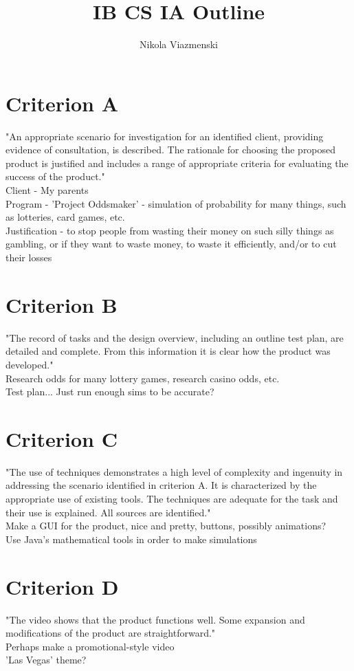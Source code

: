 \documentclass[]{article}
\title{IB CS IA Outline}
\author{Nikola Viazmenski}
\begin{document}
\maketitle


\section{Criterion A}
"An appropriate scenario for investigation for an identified client, providing evidence of consultation, is described. The rationale for choosing the proposed product is justified and includes a range of appropriate criteria for evaluating the success of the product."
\\ Client - My parents
\\ Program - 'Project Oddsmaker' - simulation of probability for many things, such as lotteries, card games, etc.
\\ Justification - to stop people from wasting their money on such silly things as gambling, or if they want to waste money, to waste it efficiently, and/or to cut their losses
\section{Criterion B}
"The record of tasks and the design overview, including an outline test plan, are detailed and complete. From this information it is clear how the product was developed."
\\ Research odds for many lottery games, research casino odds, etc.
\\ Test plan... Just run enough sims to be accurate?
\section{Criterion C}
"The use of techniques demonstrates a high level of complexity and ingenuity in addressing the scenario identified in criterion A. It is characterized by the appropriate use of existing tools. The techniques are adequate for the task and their use is explained. All sources are identified."
\\ Make a GUI for the product, nice and pretty, buttons, possibly animations?
\\ Use Java's mathematical tools in order to make simulations
\section{Criterion D}
"The video shows that the product functions well. Some expansion and modifications of the product are straightforward."
\\ Perhaps make a promotional-style video
\\ 'Las Vegas' theme?
\end{document}
